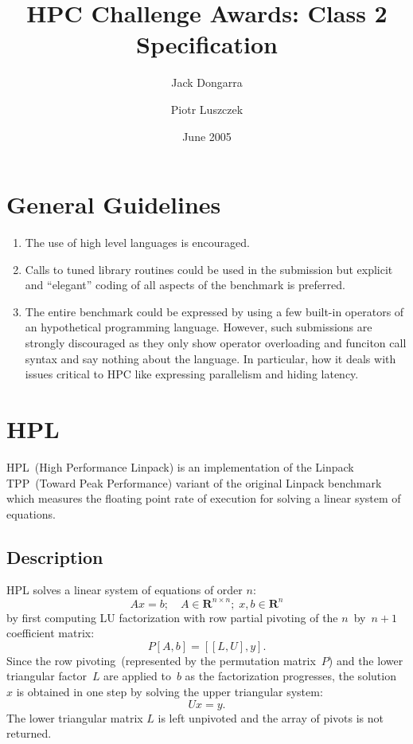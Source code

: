 \documentclass[twocolumn]{article}
\newcommand{\HPL}{\textsf{HPL}\xspace}
\begin{document}
\title{HPC Challenge Awards: Class 2 Specification}
\author{Jack Dongarra \and Piotr Luszczek}
\date{June 2005}
\maketitle

\tableofcontents

\section{General Guidelines}
\begin{enumerate}
\item The use of high level languages is encouraged.
\item Calls to tuned library routines could be used in the submission but
  explicit and ``elegant'' coding of all aspects of the benchmark is preferred.
\item The entire benchmark could be expressed by using a few built-in operators
  of an hypothetical programming language. However, such submissions are
  strongly discouraged as they only show operator overloading and funciton call
  syntax and say nothing about the language. In particular, how it deals with
  issues critical to HPC like expressing parallelism and hiding latency.
\end{enumerate}

\section{\HPL}
\HPL~(High Performance Linpack) is an implementation of the Linpack TPP~(Toward
Peak Performance) variant of the original Linpack benchmark which measures the
floating point rate of execution for solving a linear system of equations.
\subsection{Description}
\HPL solves a linear system of equations of order $n$:
\begin{equation}
A x = b;\quad A\in\mathbf{R}^{n\times n};\; x,b\in\mathbf{R}^n
\label{eqn:axb}
\end{equation}
by first computing LU factorization with row partial pivoting of the
$n$~by~$n+1$ coefficient matrix:
\begin{equation}
P [A, b] = [[L,U], y].
\label{eqn:lu}
\end{equation}
Since the row pivoting~(represented by the permutation matrix~$P$) and
the lower triangular factor~$L$ are applied to~$b$ as the factorization
progresses, the solution~$x$ is obtained in one step by solving the upper
triangular system:
\begin{equation}
  Ux = y.
\label{eqn:ubsolve}
\end{equation}
The lower triangular matrix $L$ is left unpivoted and the array of pivots is
not returned.
\end{document}
